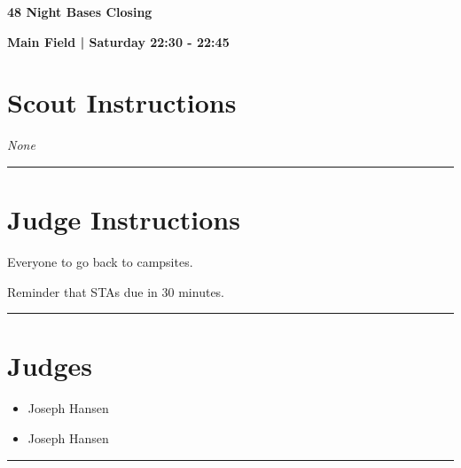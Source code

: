 \documentclass[10pt]{article}
\newcommand{\newtitle}[1]{\begin{center}{\Huge\bfseries #1 }\\ \vspace{5mm}\end{center}}
\newcommand{\newsubtitle}[1]{\begin{center}{\color{grey}\Large\bfseries #1 }\\ \vspace{5mm}\end{center}}
\begin{document}
	\vspace{1cm}


	\clearpage
		\newtitle{48 Night Bases Closing }
	\newsubtitle{Main Field | Saturday 22:30 - 22:45}
		\setcounter{section}{47}
	\section*{Scout Instructions}
		\textit{None}
	
	\vspace{0.5cm}
	\hrule
	\vspace{0.5cm}

		\section*{Judge Instructions}
		Everyone to go back to campsites.

Reminder that STAs due in 30 minutes.
\vspace{0.5cm}
	\hrule
	\vspace{0.5cm}
		\section*{\faUsers \: Judges}

		

	\begin{multicols}{2}

		\begin{itemize}
									\item Joseph Hansen
						\end{itemize}

		\vfill\null
		\columnbreak

		\begin{itemize}
									\item Joseph Hansen
						\end{itemize}

		\vfill\null

		\end{multicols}



			\vspace{0.5cm}
	\hrule
	\vspace{0.5cm}
\end{document}
